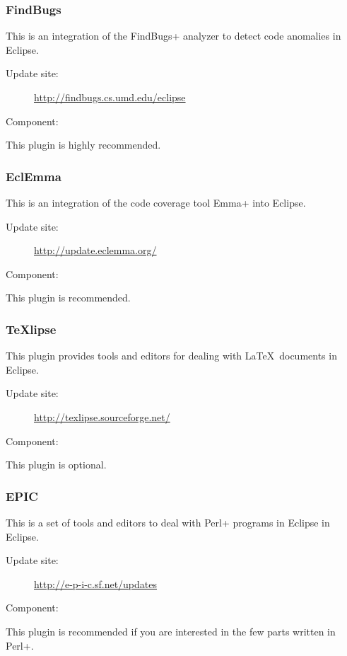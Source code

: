 \subsubsection{FindBugs}
This is an integration of the \+FindBugs+ analyzer to detect code
anomalies in Eclipse.
\begin{description}
\item [Update site:] \url{http://findbugs.cs.umd.edu/eclipse}
\item [Component:] 
\end{description}
This plugin is highly recommended.


\subsubsection{EclEmma}
This is an integration of the code coverage tool \+Emma+ into
Eclipse.
\begin{description}
\item [Update site:] \url{http://update.eclemma.org/}
\item [Component:] 
\end{description}
This plugin is recommended.


\subsubsection{TeXlipse}
This plugin provides tools and editors for dealing with \LaTeX\ 
documents in Eclipse.
\begin{description}
\item [Update site:] \url{http://texlipse.sourceforge.net/}
\item [Component:] 
\end{description}
This plugin is optional.


\subsubsection{EPIC}
This is a set of tools and editors to deal with \+Perl+
programs in Eclipse in Eclipse.
\begin{description}
\item [Update site:] \url{http://e-p-i-c.sf.net/updates}
\item [Component:] 
\end{description}
This plugin is recommended if you are interested in the few parts
written in \+Perl+.


